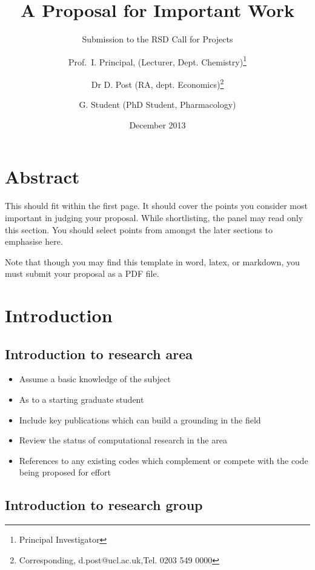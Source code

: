 \documentclass[]{scrartcl}
\title{A Proposal for Important Work}
\subtitle{Submission to the RSD Call for Projects}
\author{Prof.~I. Principal, (Lecturer, Dept. Chemistry)\footnote{Principal
  Investigator} \and Dr D. Post (RA, dept. Economics)\footnote{Corresponding,
  d.post@ucl.ac.uk,Tel. 0203 549 0000} \and G. Student (PhD Student, Pharmacology)}
\date{December 2013}
\begin{document}
\maketitle

\section{Abstract}\label{abstract}

This should fit within the first page. It should cover the points you
consider most important in judging your proposal. While shortlisting,
the panel may read only this section. You should select points from
amongst the later sections to emphasise here.

Note that though you may find this template in word, latex, or markdown,
you must submit your proposal as a PDF file.

\pagebreak

\section{Introduction}\label{introduction}

\subsection{Introduction to research
area}\label{introduction-to-research-area}

\begin{itemize}
\itemsep1pt\parskip0pt
\item
  Assume a basic knowledge of the subject
\item
  As to a starting graduate student
\item
  Include key publications which can build a grounding in the field
\item
  Review the status of computational research in the area
\item
  References to any existing codes which complement or compete with the
  code being proposed for effort
\end{itemize}

\subsection{Introduction to research
group}\label{introduction-to-research-group}
\end{document}
